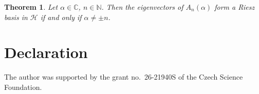 \documentclass[11pt, a4paper,reqno]{amsart}
\theoremstyle{plain}
\newtheorem{theorem}{{Theorem}}[section]
\theoremstyle{definition}
\theoremstyle{remark}
\newcommand{\1}{\mathds 1}
\begin{document}
\begin{theorem}\label{T: GraphRieszCriterion}
    Let $\alpha \in \mathbb C$, $n \in \mathbb N$. Then the eigenvectors of $A_n(\alpha)$ form a Riesz basis in $\mathcal H$ if and only if $\alpha \neq \pm n$.
\end{theorem}

\section*{Declaration}
The author was supported by the grant no.~26-21940S of the Czech Science Foundation.












%
\providecommand{\bysame}{\leavevmode\hbox to3em{\hrulefill}\thinspace}
\providecommand{\MR}{\relax\ifhmode\unskip\space\fi MR }
\providecommand{\MRhref}[2]{%
  \href{http://www.ams.org/mathscinet-getitem?mr=#1}{#2}
}
\providecommand{\href}[2]{#2}
\end{document}
